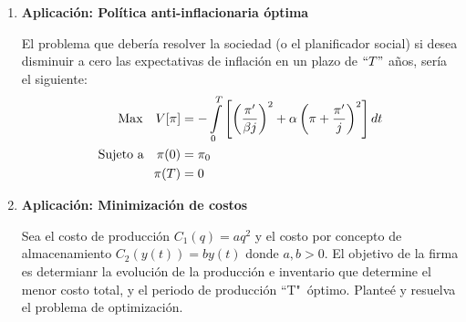 \documentclass[11pt,a4paper]{article}
\begin{document}
\begin{enumerate}
		\item \textbf{Aplicación: Política anti-inflacionaria óptima}\

			El problema que debería resolver la sociedad (o el planificador social) si desea disminuir a cero las expectativas de inflación en un plazo de $``T"$ años, sería el siguiente:
				\begin{align*}
					\textup{Max}\quad V[\pi]&=-\int\limits_{0}^{T}\left[\left( \frac{\pi'}{\beta j}\right)^2 + \alpha\left(\pi+\frac{\pi'}{j}\right) ^2\right]dt\\
					\textup{Sujeto a}\quad \pi (0)&=\pi_0\\
					\pi (T)&=0
				\end{align*}

		\item \textbf{Aplicación: Minimización de costos}\

			Sea el costo de producción $C_1(q)=aq^2$ y el costo por concepto de almacenamiento $C_2(y(t))=by(t)$ donde $a,b>0$. El objetivo de la firma es determianr la evolución de la producción e inventario que determine el menor costo total, y el periodo de producción ``T"\ óptimo. Planteé y resuelva el problema de optimización.
	\end{enumerate}
\end{document}
